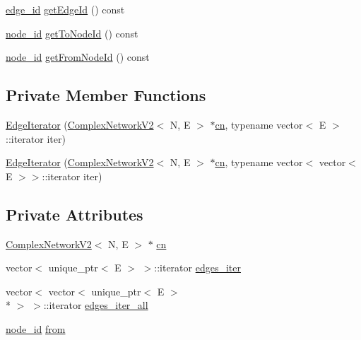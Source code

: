 \begin{DoxyCompactItemize}
\item 
\hyperlink{_complex_network_v2_8hpp_ad7d18d7b90a45b6625704e92d10aa3a0}{edge\+\_\+id} \hyperlink{class_complex_network_v2_1_1_edge_iterator_a2bf088c84d8e6fc5607513613d1b426b}{get\+Edge\+Id} () const 
\item 
\hyperlink{_complex_network_v2_8hpp_a8323334ca788fde39682469321590d52}{node\+\_\+id} \hyperlink{class_complex_network_v2_1_1_edge_iterator_a2e7e551036120313906fa8b346cef1b9}{get\+To\+Node\+Id} () const 
\item 
\hyperlink{_complex_network_v2_8hpp_a8323334ca788fde39682469321590d52}{node\+\_\+id} \hyperlink{class_complex_network_v2_1_1_edge_iterator_a2abaa9cbc98e0e96af88a9e6deba2282}{get\+From\+Node\+Id} () const 
\end{DoxyCompactItemize}
\subsection*{Private Member Functions}
\begin{DoxyCompactItemize}
\item 
\hyperlink{class_complex_network_v2_1_1_edge_iterator_ad60d1d70484d303a9b2be38e556567d6}{Edge\+Iterator} (\hyperlink{class_complex_network_v2}{Complex\+Network\+V2}$<$ N, E $>$ $\ast$\hyperlink{class_complex_network_v2_1_1_edge_iterator_a709735909d7520bbca232fa1ca059b8e}{cn}, typename vector$<$ E $>$\+::iterator iter)
\item 
\hyperlink{class_complex_network_v2_1_1_edge_iterator_ab1b0ff7b139d0e192a9be548b75c3829}{Edge\+Iterator} (\hyperlink{class_complex_network_v2}{Complex\+Network\+V2}$<$ N, E $>$ $\ast$\hyperlink{class_complex_network_v2_1_1_edge_iterator_a709735909d7520bbca232fa1ca059b8e}{cn}, typename vector$<$ vector$<$ E $>$$>$\+::iterator iter)
\end{DoxyCompactItemize}
\subsection*{Private Attributes}
\begin{DoxyCompactItemize}
\item 
\hyperlink{class_complex_network_v2}{Complex\+Network\+V2}$<$ N, E $>$ $\ast$ \hyperlink{class_complex_network_v2_1_1_edge_iterator_a709735909d7520bbca232fa1ca059b8e}{cn}
\item 
vector$<$ unique\+\_\+ptr$<$ E $>$ $>$\+::iterator \hyperlink{class_complex_network_v2_1_1_edge_iterator_a5188ace1babf02c9839d5e277e1d2842}{edges\+\_\+iter}
\item 
vector$<$ vector$<$ unique\+\_\+ptr$<$ E $>$\\*
 $>$ $>$\+::iterator \hyperlink{class_complex_network_v2_1_1_edge_iterator_a9e36b31624697cb24ff09aac7b56570a}{edges\+\_\+iter\+\_\+all}
\item 
\hyperlink{_complex_network_v2_8hpp_a8323334ca788fde39682469321590d52}{node\+\_\+id} \hyperlink{class_complex_network_v2_1_1_edge_iterator_a9c12853c790c6168d6439e84f9093e61}{from}
\end{DoxyCompactItemize}

